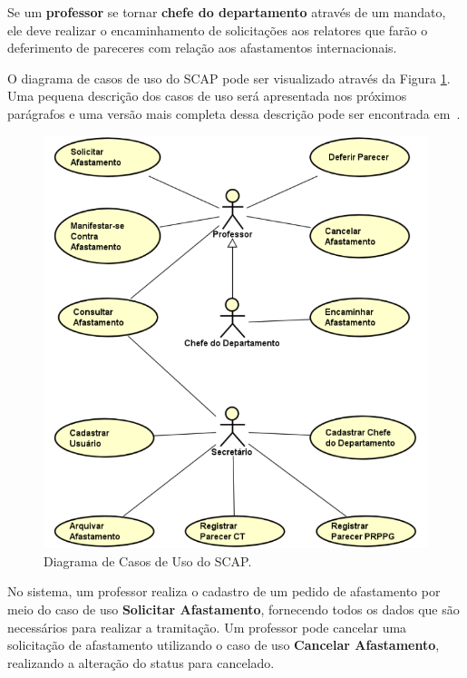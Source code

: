 Se um \textbf{professor} se tornar \textbf{chefe do departamento} através de um mandato, ele deve realizar o encaminhamento de solicitações aos relatores que farão o deferimento de pareceres com relação aos afastamentos internacionais.

O diagrama de casos de uso do SCAP pode ser visualizado através da Figura \ref{fig-requisitos-casos-uso}. Uma pequena descrição dos casos de uso será apresentada nos próximos parágrafos e uma versão mais completa dessa descrição pode ser encontrada em~\cite{duarte-pg14,prado-pg15}.
     
\begin{figure}[h]
	\centering
	\includegraphics[scale=0.5]{figuras/fig-requisitos-casos-uso} 
	\caption{Diagrama de Casos de Uso do SCAP.}
	\label{fig-requisitos-casos-uso}
\end{figure}

No sistema, um professor realiza o cadastro de um pedido de afastamento por meio do caso de uso \textbf{Solicitar Afastamento}, fornecendo todos os dados que são necessários para realizar a tramitação. Um professor pode cancelar uma solicitação de afastamento utilizando o caso de uso \textbf{Cancelar Afastamento}, realizando a alteração do status para cancelado.

